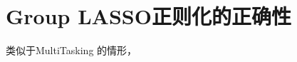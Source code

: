 \documentclass[main.tex]{subfiles}
\begin{document}
\chapter{Group LASSO正则化的正确性}\label{chp:proof_group}
类似于MultiTasking 的情形， 
\end{document}
